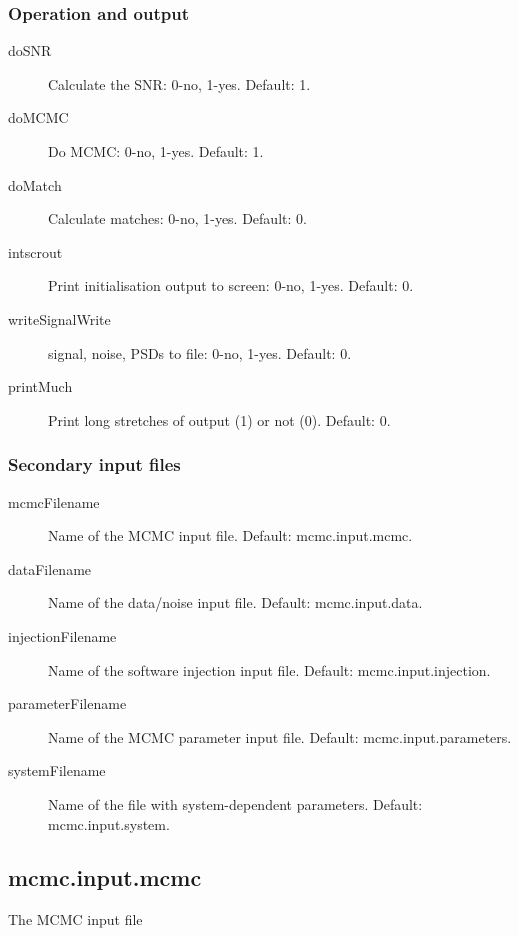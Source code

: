 \documentclass[10pt]{article}
\begin{document}
\subsubsection{Operation and output}
\begin{description}
\item[doSNR] Calculate the SNR: 0-no, 1-yes. Default: 1.
\item[doMCMC] Do MCMC: 0-no, 1-yes.  Default: 1.
\item[doMatch] Calculate matches: 0-no, 1-yes.  Default: 0.
\item[intscrout]  Print initialisation output to screen: 0-no, 1-yes.  Default: 0.
\item[writeSignalWrite] signal, noise, PSDs to file: 0-no, 1-yes.  Default: 0.
\item[printMuch]  Print long stretches of output (1) or not (0).  Default: 0.
\end{description}


\subsubsection{Secondary input files}
\begin{description}
\item[mcmcFilename] Name of the MCMC input file.  Default: mcmc.input.mcmc.
\item[dataFilename] Name of the data/noise input file.  Default: mcmc.input.data.
\item[injectionFilename] Name of the software injection input file.  Default: mcmc.input.injection.
\item[parameterFilename] Name of the MCMC parameter input file.  Default: mcmc.input.parameters.
\item[systemFilename] Name of the file with system-dependent parameters.  Default: mcmc.input.system.
\end{description}










\pagebreak
\subsection{mcmc.input.mcmc}                                                                                                                                               
The MCMC input file                                                                                                                                                 
                                                                                                                                                                    
\end{document}
